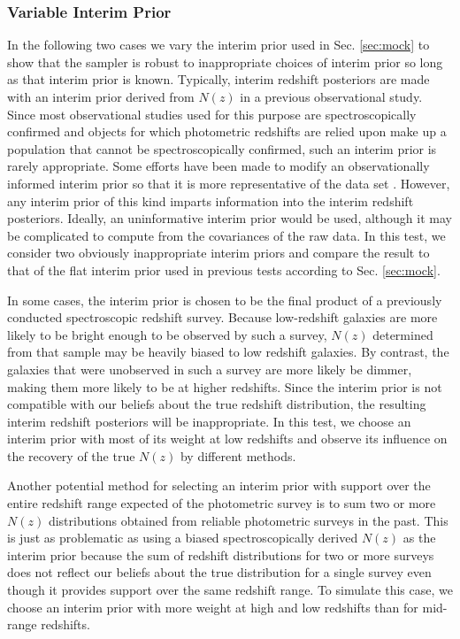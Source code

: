 \documentclass[preprint]{aastex}
\begin{document}
\subsubsection{Variable Interim Prior}
\label{sec:interim-data}

In the following two cases we vary the interim prior used in Sec. 
\ref{sec:mock} to show that the sampler is robust to inappropriate choices of 
interim prior so long as that interim prior is known.  Typically, interim 
redshift posteriors are made with an interim prior derived from $N(z)$ in a 
previous observational study.  Since most observational studies used for this 
purpose are spectroscopically confirmed and objects for which photometric 
redshifts are relied upon make up a population that cannot be spectroscopically 
confirmed, such an interim prior is rarely appropriate.  Some efforts have been 
made to modify an observationally informed interim prior so that it is more 
representative of the data set \citep{Sheldon2012}.  However, any interim prior 
of this kind imparts information into the interim redshift posteriors.  
Ideally, an uninformative interim prior would be used, although it may be 
complicated to compute from the covariances of the raw data.  In this test, we 
consider two obviously inappropriate interim priors and compare the result to 
that of the flat interim prior used in previous tests according to Sec. 
\ref{sec:mock}.

In some cases, the interim prior is chosen to be the final product of a 
previously conducted spectroscopic redshift survey.  Because low-redshift 
galaxies are more likely to be bright enough to be observed by such a survey, 
$N(z)$ determined from that sample may be heavily biased to low redshift 
galaxies.  By contrast, the galaxies that were unobserved in such a survey are 
more likely be dimmer, making them more likely to be at higher redshifts.  
Since the interim prior is not compatible with our beliefs about the true 
redshift distribution, the resulting interim redshift posteriors will be 
inappropriate.  In this test, we choose an interim prior with most of its 
weight at low redshifts and observe its influence on the recovery of the true 
$N(z)$ by different methods.  

Another potential method for selecting an interim prior with support over the 
entire redshift range expected of the photometric survey is to sum two or more 
$N(z)$ distributions obtained from reliable photometric surveys in the past.  
This is just as problematic as using a biased spectroscopically derived $N(z)$ 
as the interim prior because the sum of redshift distributions for two or more 
surveys does not reflect our beliefs about the true distribution for a single 
survey even though it provides support over the same redshift range.  To 
simulate this case, we choose an interim prior with more weight at high and low 
redshifts than for mid-range redshifts.  
\end{document}

